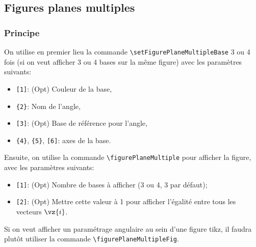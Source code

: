 \documentclass[11pt]{ltxdockit}[2010/09/26]
\begin{document}
\subsection{Figures planes multiples}
\subsubsection{Principe}
\noindent On utilise en premier lieu la commande \verb!\setFigurePlaneMultipleBase! 3 ou 4 fois (si on veut afficher 3 ou 4 bases sur la même figure) avec les paramètres suivants: 
\begin{itemize}
\item \verb![1]!: (Opt) Couleur de la base,
\item \verb!{2}!: Nom de l'angle,
\item \verb![3]!: (Opt) Base de référence pour l'angle,
\item \verb!{4}!, \verb!{5}!, \verb![6]!: axes de la base.
\end{itemize}

\vspace{1em}
\noindent Ensuite, on utilise la commande \verb!\figurePlaneMultiple! pour afficher la figure,  avec les paramètres suivants: 
\begin{itemize}
\item \verb![1]!: (Opt) Nombre de bases à afficher (3 ou 4, 3 par défaut);
\item \verb![2]!: (Opt) Mettre cette valeur à 1 pour afficher l'égalité entre tous les vecteurs $\vz{i}$.
\end{itemize}

\noindent Si on veut afficher un paramétrage angulaire au sein d'une figure tikz, il faudra plutôt utiliser la commande \verb!\figurePlaneMultipleFig!.
\end{document}
